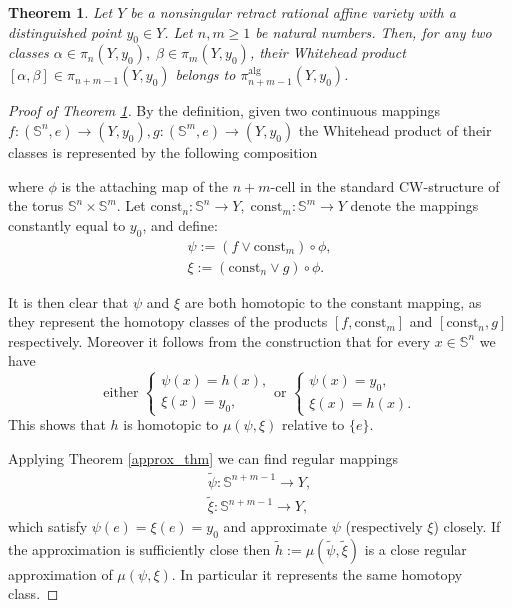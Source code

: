 \documentclass[10pt,a4paper]{amsart}
\newtheorem{thm}{Theorem}
\newcommand{\alg}{\mathrm{alg}}
\newcommand{\s}{\mathbb{S}}
\begin{document}
\begin{thm}\label{thm_products}
Let $Y$ be a nonsingular retract rational affine variety with a distinguished point $y_0\in Y$. Let $n,m\geq 1$ be natural numbers. Then, for any two classes $\alpha\in \pi_n(Y,y_0),\;\beta\in \pi_m(Y,y_0)$, their Whitehead product $[\alpha,\beta]\in\pi_{n+m-1}(Y,y_0)$ belongs to $\pi_{n+m-1}^\alg(Y,y_0)$.
\end{thm}

\begin{proof}[Proof of Theorem \ref{thm_products}]
By the definition, given two continuous mappings $f:(\s^n,e)\rightarrow (Y,y_0),g:(\s^m,e)\rightarrow (Y,y_0)$ the Whitehead product of their classes is represented by the following composition
\begin{center}
\end{center}
where $\phi$ is the attaching map of the $n+m$-cell in the standard CW-structure of the torus $\s^n\times \s^m$. Let $\text{const}_n:\s^n\rightarrow Y,\;\text{const}_m:\s^m\rightarrow Y$ denote the mappings constantly equal to $y_0$, and define:
\begin{align*}
    \psi:=(f\vee \text{const}_m)\circ \phi, \\
    \xi:=(\text{const}_n\vee g)\circ \phi.
\end{align*}

It is then clear that $\psi$ and $\xi$ are both homotopic to the constant mapping, as they represent the homotopy classes of the products $[f,\text{const}_m]$ and $[\text{const}_n, g]$ respectively. Moreover it follows from the construction that for every $x\in \s^n$ we have
\begin{equation*}
\text{either }
\begin{cases}
\psi(x)=h(x),\\
\xi(x)=y_0,
\end{cases}
\text{or }
\begin{cases}
\psi(x)=y_0,\\
\xi(x)=h(x).
\end{cases}
\end{equation*}
This shows that $h$ is homotopic to $\mu(\psi,\xi)$ relative to $\{e\}$.

Applying Theorem \ref{approx_thm} we can find regular mappings 
\begin{align*}
    \tilde{\psi}:\s^{n+m-1}\rightarrow Y,\\
    \tilde{\xi}:\s^{n+m-1}\rightarrow Y,
\end{align*}
which satisfy $\psi(e)=\xi(e)=y_0$ and approximate $\psi$ (respectively $\xi$) closely. If the approximation is sufficiently close then $\tilde{h}:=\mu(\tilde{\psi},\tilde{\xi})$ is a close regular approximation of $\mu(\psi,\xi)$. In particular it represents the same homotopy class.
\end{proof}
\end{document}
